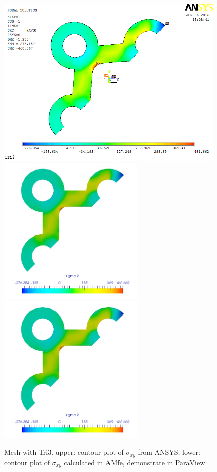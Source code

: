 \begin{figure}[htbp]
	\begin{center}
		\includegraphics[width=11cm,clip]{TTri3_Sxy.png} 	
		\includegraphics[width=7cm,clip]{TTri3_Sxy_PD.png} 		
		\includegraphics[width=7cm,clip]{TTri3_Sxy_P.png} 		
		\caption{Mesh with Tri3. upper: contour plot of $\sigma_{xy}$ from ANSYS; lower: contour plot of $\sigma_{xy}$ calculated in AMfe, demonstrate in ParaView} \label{fig: Tri3_Sxy}
	\end{center}
\end{figure}
\clearpage 

